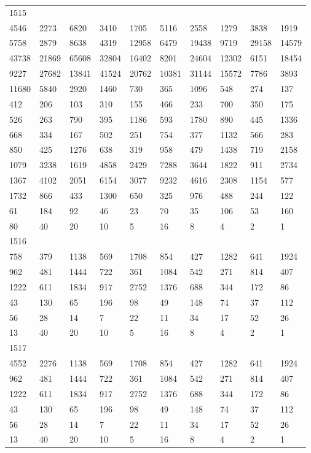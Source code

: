 \begin{longtable}{*{10}{l}}
1515&&&&&&&&&\\
4546& 2273& 6820& 3410& 1705& 5116& 2558& 1279& 3838& 1919\\
5758& 2879& 8638& 4319& 12958& 6479& 19438& 9719& 29158& 14579\\
43738& 21869& 65608& 32804& 16402& 8201& 24604& 12302& 6151& 18454\\
9227& 27682& 13841& 41524& 20762& 10381& 31144& 15572& 7786& 3893\\
11680& 5840& 2920& 1460& 730& 365& 1096& 548& 274& 137\\
412& 206& 103& 310& 155& 466& 233& 700& 350& 175\\
526& 263& 790& 395& 1186& 593& 1780& 890& 445& 1336\\
668& 334& 167& 502& 251& 754& 377& 1132& 566& 283\\
850& 425& 1276& 638& 319& 958& 479& 1438& 719& 2158\\
1079& 3238& 1619& 4858& 2429& 7288& 3644& 1822& 911& 2734\\
1367& 4102& 2051& 6154& 3077& 9232& 4616& 2308& 1154& 577\\
1732& 866& 433& 1300& 650& 325& 976& 488& 244& 122\\
61& 184& 92& 46& 23& 70& 35& 106& 53& 160\\
80& 40& 20& 10& 5& 16& 8& 4& 2& 1\\

1516&&&&&&&&&\\
758& 379& 1138& 569& 1708& 854& 427& 1282& 641& 1924\\
962& 481& 1444& 722& 361& 1084& 542& 271& 814& 407\\
1222& 611& 1834& 917& 2752& 1376& 688& 344& 172& 86\\
43& 130& 65& 196& 98& 49& 148& 74& 37& 112\\
56& 28& 14& 7& 22& 11& 34& 17& 52& 26\\
13& 40& 20& 10& 5& 16& 8& 4& 2& 1\\

1517&&&&&&&&&\\
4552& 2276& 1138& 569& 1708& 854& 427& 1282& 641& 1924\\
962& 481& 1444& 722& 361& 1084& 542& 271& 814& 407\\
1222& 611& 1834& 917& 2752& 1376& 688& 344& 172& 86\\
43& 130& 65& 196& 98& 49& 148& 74& 37& 112\\
56& 28& 14& 7& 22& 11& 34& 17& 52& 26\\
13& 40& 20& 10& 5& 16& 8& 4& 2& 1\\


\end{longtable}
